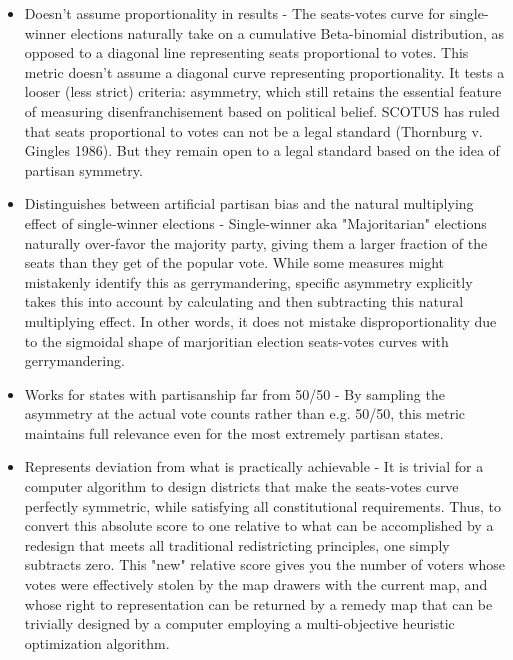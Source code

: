 \documentclass[preprint,12pt]{article}
\begin{document}
\begin{itemize}

\item Doesn't assume proportionality in results - The seats-votes curve for single-winner elections naturally take on a cumulative Beta-binomial distribution, as opposed to a diagonal line representing seats proportional to votes.  This metric doesn't assume a diagonal curve representing proportionality.  It tests a looser (less strict) criteria: asymmetry, which still retains the essential feature of measuring disenfranchisement based on political belief.  SCOTUS has ruled that seats proportional to votes can not be a legal standard (Thornburg v. Gingles 1986).   But they remain open to a legal standard based on the idea of partisan symmetry.
 
\item Distinguishes between artificial partisan bias and the natural multiplying effect of single-winner elections -  Single-winner aka "Majoritarian" elections naturally over-favor the majority party, giving them a larger fraction of the seats than they get of the popular vote.  
While some measures might mistakenly identify this as gerrymandering, specific asymmetry explicitly takes this into account by calculating and then subtracting this natural multiplying effect.
In other words, it does not mistake disproportionality due to the sigmoidal shape of marjoritian election seats-votes curves with gerrymandering.

\item Works for states with partisanship far from 50/50 - By sampling the asymmetry at the actual vote counts rather than e.g. 50/50, this metric maintains full relevance even for the most extremely partisan states.

\item Represents deviation from what is practically achievable - It is trivial for a computer algorithm to design districts that make the seats-votes curve perfectly symmetric, while satisfying all constitutional requirements.  
Thus, to convert this absolute score to one relative to what can be accomplished by a redesign that meets all traditional redistricting principles, one simply subtracts zero.  
This "new" relative score gives you the number of voters whose votes were effectively stolen by the map drawers with the current map, and whose right to representation can be returned by a remedy map that can be trivially designed by a computer employing a multi-objective heuristic optimization algorithm.


\end{itemize}
\end{document}
